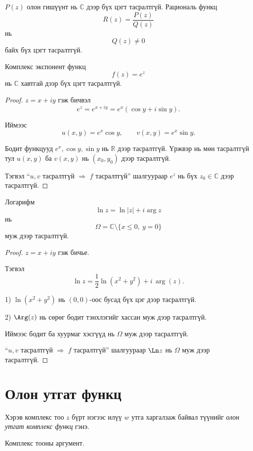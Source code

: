 \begin{thm}

$P(z)$ олон гишүүнт нь $\mathbb{C}$ дээр бүх цэгт тасралтгүй.
Рациональ функц
\[
R(z)=\frac{P(z)}{Q(z)}
\]
нь
\[
Q(z)\neq 0
\]
байх бүх цэгт тасралтгүй.
\end{thm}
\begin{thm}
Комплекс экспонент функц
\[
f(z)=e^z
\]
нь $\mathbb{C}$ хавтгай дээр бүх цэгт тасралтгүй.
\end{thm}

\begin{proof}
$z=x+iy$ гэж бичвэл
\[
e^z=e^{x+iy}=e^x(\cos y+i\sin y).
\]

Иймээс
\[
u(x,y)=e^x\cos y,\qquad v(x,y)=e^x\sin y.
\]

Бодит функцууд $e^x,\cos y,\sin y$ нь $\mathbb{R}$ дээр тасралтгүй.
Үржвэр нь мөн тасралтгүй тул $u(x,y)$ ба $v(x,y)$ нь
$(x_0,y_0)$ дээр тасралтгүй.

Тэгвэл “$u,v$ тасралтгүй $\Rightarrow$ $f$ тасралтгүй” шалгуураар
$e^z$ нь бүх $z_0\in\mathbb{C}$ дээр тасралтгүй.
\end{proof}

\begin{thm}
Логарифм
\[
\ln z=\ln|z|+i\arg z
\]
нь
\[
\Omega=\mathbb{C}\setminus\{x\le 0,\ y=0\}
\]
муж дээр тасралтгүй.
\end{thm}

\begin{proof}
$z=x+iy$ гэж бичье.

Тэгвэл
\[
\ln z=\frac12\ln(x^2+y^2)
+i\,\arg(z).
\]

1) $\ln(x^2+y^2)$ нь $(0,0)$-оос бусад бүх цэг дээр тасралтгүй.

2) $\Arg(z)$ нь сөрөг бодит тэнхлэгийг хассан муж дээр тасралтгүй.

Иймээс бодит ба хуурмаг хэсгүүд нь $\Omega$ муж дээр тасралтгүй.

“$u,v$ тасралтгүй $\Rightarrow$ $f$ тасралтгүй” шалгуураар
$\Ln z$ нь $\Omega$ муж дээр тасралтгүй.
\end{proof}
\section{Олон утгат функц}

\begin{dfn}
Хэрэв комплекс тоо $z$ бүрт нэгээс илүү $w$ утга харгалзаж байвал
түүнийг \emph{олон утгат комплекс функц} гэнэ.
\end{dfn}
\begin{exm}
Комплекс тооны аргумент.
\end{exm}

